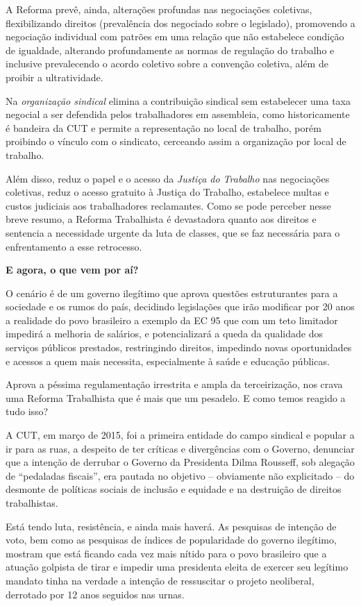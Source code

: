 A Reforma prevê, ainda, alterações profundas nas negociações coletivas,
flexibilizando direitos (prevalência dos negociado sobre o legislado),
promovendo a negociação individual com patrões em uma relação que não
estabelece condição de igualdade, alterando profundamente as normas de
regulação do trabalho e inclusive prevalecendo o acordo coletivo sobre a
convenção coletiva, além de proibir a ultratividade.

Na \emph{organização sindical} elimina a contribuição sindical sem
estabelecer uma taxa negocial a ser defendida pelos trabalhadores em
assembleia, como historicamente é bandeira da CUT e permite a
representação no local de trabalho, porém proibindo o vínculo com o
sindicato, cerceando assim a organização por local de trabalho.

Além disso, reduz o papel e o acesso da \emph{Justiça do Trabalho} nas
negociações coletivas, reduz o acesso gratuito à Justiça do Trabalho,
estabelece multas e custos judiciais aos trabalhadores reclamantes. Como
se pode perceber nesse breve resumo, a Reforma Trabalhista é devastadora
quanto aos direitos e sentencia a necessidade urgente da luta de
classes, que se faz necessária para o enfrentamento a esse retrocesso.

\textbf{E agora, o que vem por aí?}

O cenário é de um governo ilegítimo que aprova questões estruturantes
para a sociedade e os rumos do país, decidindo legislações que irão
modificar por 20 anos a realidade do povo brasileiro a exemplo da EC 95
que com um teto limitador impedirá a melhoria de salários, e
potencializará a queda da qualidade dos serviços públicos prestados,
restringindo direitos, impedindo novas oportunidades e acessos a quem
mais necessita, especialmente à saúde e educação públicas.

Aprova a péssima regulamentação irrestrita e ampla da terceirização, nos
crava uma Reforma Trabalhista que é mais que um pesadelo. E como temos
reagido a tudo isso?

A CUT, em março de 2015, foi a primeira entidade do campo sindical e
popular a ir para as ruas, a despeito de ter críticas e divergências com
o Governo, denunciar que a intenção de derrubar o Governo da Presidenta
Dilma Rousseff, sob alegação de ``pedaladas fiscais'', era pautada no
objetivo -- obviamente não explicitado -- do desmonte de políticas
sociais de inclusão e equidade e na destruição de direitos trabalhistas.

Está tendo luta, resistência, e ainda mais haverá. As pesquisas de
intenção de voto, bem como as pesquisas de índices de popularidade do
governo ilegítimo, mostram que está ficando cada vez mais nítido para o
povo brasileiro que a atuação golpista de tirar e impedir uma presidenta
eleita de exercer seu legítimo mandato tinha na verdade a intenção de
ressuscitar o projeto neoliberal, derrotado por 12 anos seguidos nas
urnas.

